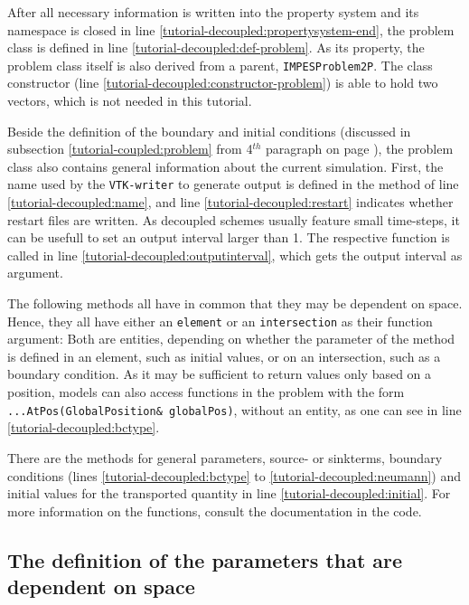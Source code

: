 After all necessary information is written into the property system and 
its namespace is closed in line \ref{tutorial-decoupled:propertysystem-end},
the problem class is defined in line \ref{tutorial-decoupled:def-problem}. 
As its property, the problem class itself is also derived from a parent, 
\texttt{IMPESProblem2P}. The class constructor (line 
\ref{tutorial-decoupled:constructor-problem}) is able to hold two vectors,
which is not needed in this tutorial.

Beside the definition of the boundary and initial conditions (discussed in 
subsection \ref{tutorial-coupled:problem} from 4$^{th}$ paragraph on page \pageref{tutorial-coupled:boundaryStart}), the problem class also contains
general information about the current simulation. First, the name used by
the \texttt{VTK-writer} to generate output is defined in the method of line
\ref{tutorial-decoupled:name}, and line \ref{tutorial-decoupled:restart} indicates
whether restart files are written. As decoupled schemes usually feature small 
time-steps, it can be usefull to set an output interval larger than 1. The respective function is called in line \ref{tutorial-decoupled:outputinterval}, which gets the output interval as argument.

The following methods all have in common that they may be dependent on space.
Hence, they all have either an \texttt{element} or an \texttt{intersection} as their
function argument: Both are \Dune entities, depending on whether the parameter of the method is defined in an element, such as 
    initial values, or on an intersection, such as a boundary condition. As it may be sufficient to return values only based on a position, \Dumux models can also access functions in the problem with the form \mbox{\texttt{...AtPos(GlobalPosition\& globalPos)}}, without an \Dune entity, as one can see in line \ref{tutorial-decoupled:bctype}.

There are the methods for general parameters, source- or
sinkterms, boundary conditions (lines \ref{tutorial-decoupled:bctype} to
\ref{tutorial-decoupled:neumann}) and initial values for the transported
quantity in line \ref{tutorial-decoupled:initial}. For more information
on the functions, consult the documentation in the code.

\subsection{The definition of the parameters that are dependent on space}\label{tutorial-decoupled:description-spatialParameters}

